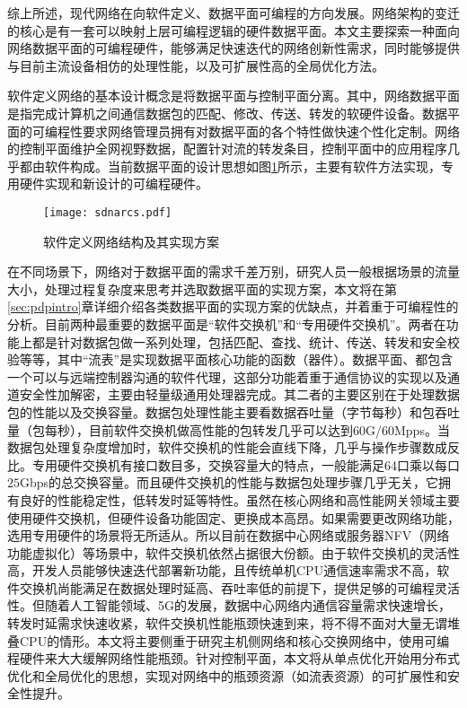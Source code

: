 综上所述，现代网络在向软件定义、数据平面可编程的方向发展。网络架构的变迁的核心是有一套可以映射上层可编程逻辑的硬件数据平面。本文主要探索一种面向网络数据平面的可编程硬件，能够满足快速迭代的网络创新性需求，同时能够提供与目前主流设备相仿的处理性能，以及可扩展性高的全局优化方法。

\label{chap112}

软件定义网络的基本设计概念是将数据平面与控制平面分离。其中，网络数据平面是指完成计算机之间通信数据包的匹配、修改、传送、转发的软硬件设备。数据平面的可编程性要求网络管理员拥有对数据平面的各个特性做快速个性化定制。网络的控制平面维护全网视野数据，配置针对流的转发条目，控制平面中的应用程序几乎都由软件构成。当前数据平面的设计思想如图\ref{fig:sdnarcs}所示，主要有软件方法实现，专用硬件实现和新设计的可编程硬件。

\begin{figure}[!ht]
	\centering
	\texttt{[image: sdnarcs.pdf]}
	\caption{软件定义网络结构及其实现方案} \label{fig:sdnarcs}
\end{figure}

在不同场景下，网络对于数据平面的需求千差万别，研究人员一般根据场景的流量大小，处理过程复杂度来思考并选取数据平面的实现方案，本文将在第\ref{sec:pdpintro}章详细介绍各类数据平面的实现方案的优缺点，并着重于可编程性的分析。目前两种最重要的数据平面是“软件交换机”和“专用硬件交换机”。两者在功能上都是针对数据包做一系列处理，包括匹配、查找、统计、传送、转发和安全校验等等，其中“流表”是实现数据平面核心功能的函数（器件）。数据平面、都包含一个可以与远端控制器沟通的软件代理，这部分功能着重于通信协议的实现以及通道安全性加解密，主要由轻量级通用处理器完成。其二者的主要区别在于处理数据包的性能以及交换容量。数据包处理性能主要看数据吞吐量（字节每秒）和包吞吐量（包每秒），目前软件交换机做高性能的包转发几乎可以达到60G/60Mpps。当数据包处理复杂度增加时，软件交换机的性能会直线下降，几乎与操作步骤数成反比。专用硬件交换机有接口数目多，交换容量大的特点，一般能满足64口乘以每口$25$Gbps的总交换容量。而且硬件交换机的性能与数据包处理步骤几乎无关，它拥有良好的性能稳定性，低转发时延等特性。虽然在核心网络和高性能网关领域主要使用硬件交换机，但硬件设备功能固定、更换成本高昂。如果需要更改网络功能，选用专用硬件的场景将无所适从。所以目前在数据中心网络或服务器NFV（网络功能虚拟化）等场景中，软件交换机依然占据很大份额。由于软件交换机的灵活性高，开发人员能够快速迭代部署新功能，且传统单机CPU通信速率需求不高，软件交换机尚能满足在数据处理时延高、吞吐率低的前提下，提供足够的可编程灵活性。但随着人工智能领域、5G的发展，数据中心网络内通信容量需求快速增长，转发时延需求快速收紧，软件交换机性能瓶颈快速到来，将不得不面对大量无谓堆叠CPU的情形。本文将主要侧重于研究主机侧网络和核心交换网络中，使用可编程硬件来大大缓解网络性能瓶颈。针对控制平面，本文将从单点优化开始用分布式优化和全局优化的思想，实现对网络中的瓶颈资源（如流表资源）的可扩展性和安全性提升。

